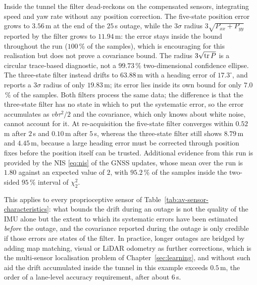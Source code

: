 \begin{example}
Inside the tunnel the filter dead-reckons on the compensated sensors, integrating speed and yaw rate without any position correction. The five-state position error grows to $3.56$\,m at the end of the $25$\,s outage, while the $3\sigma$ radius $3\sqrt{P_{xx}+P_{yy}}$ reported by the filter grows to $11.94$\,m: the error stays inside the bound throughout the run ($100$\,\% of the samples), which is encouraging for this realisation but does not prove a covariance bound. The radius $3\sqrt{\operatorname{tr} P}$ is a circular trace-based diagnostic, not a $99.73\,\%$ two-dimensional confidence ellipse. The three-state filter instead drifts to $63.88$\,m with a heading error of $17.3^{\circ}$, and reports a $3\sigma$ radius of only $19.83$\,m; its error lies inside its own bound for only $7.0$\,\% of the samples. Both filters process the same data; the difference is that the three-state filter has no state in which to put the systematic error, so the error accumulates as $vb\tau^{2}/2$ and the covariance, which only knows about white noise, cannot account for it. At re-acquisition the five-state filter converges within $0.52$\,m after $2$\,s and $0.10$\,m after $5$\,s, whereas the three-state filter still shows $8.79$\,m and $4.45$\,m, because a large heading error must be corrected through position fixes before the position itself can be trusted. Additional evidence from this run is provided by the NIS \eqref{eq:nis} of the GNSS updates, whose mean over the run is $1.80$ against an expected value of $2$, with $95.2$\,\% of the samples inside the two-sided $95$\,\% interval of $\chi^{2}_{2}$.

This applies to every proprioceptive sensor of Table~\ref{tab:av-sensor-characteristics}: what bounds the drift during an outage is not the quality of the IMU alone but the extent to which its systematic errors have been estimated \emph{before} the outage, and the covariance reported during the outage is only credible if those errors are states of the filter. In practice, longer outages are bridged by adding map matching, visual or LiDAR odometry as further corrections, which is the multi-sensor localisation problem of Chapter~\ref{sec:learning}, and without such aid the drift accumulated inside the tunnel in this example exceeds $0.5$\,m, the order of a lane-level accuracy requirement, after about $6$\,s.
\end{example}

